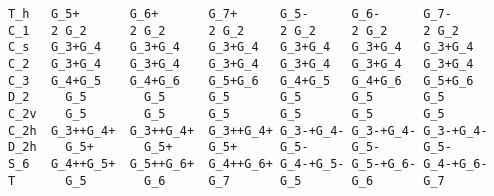 \documentclass[12pt,a4paper]{article}
\begin{document}
\begin{verbatim}
T_h   G_5+       G_6+       G_7+      G_5-      G_6-      G_7-
C_1   2 G_2      2 G_2      2 G_2     2 G_2     2 G_2     2 G_2
C_s   G_3+G_4    G_3+G_4    G_3+G_4   G_3+G_4   G_3+G_4   G_3+G_4
C_2   G_3+G_4    G_3+G_4    G_3+G_4   G_3+G_4   G_3+G_4   G_3+G_4
C_3   G_4+G_5    G_4+G_6    G_5+G_6   G_4+G_5   G_4+G_6   G_5+G_6
D_2     G_5        G_5      G_5       G_5       G_5       G_5
C_2v    G_5        G_5      G_5       G_5       G_5       G_5
C_2h  G_3++G_4+  G_3++G_4+  G_3++G_4+ G_3-+G_4- G_3-+G_4- G_3-+G_4-
D_2h    G_5+       G_5+     G_5+      G_5-      G_5-      G_5-
S_6   G_4++G_5+  G_5++G_6+  G_4++G_6+ G_4-+G_5- G_5-+G_6- G_4-+G_6-
T       G_5        G_6      G_7       G_5       G_6       G_7
\end{verbatim}

\newpage
\end{document}
